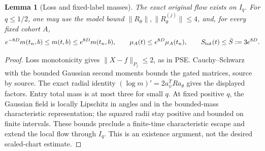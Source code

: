 \documentclass[11pt]{article}
\numberwithin{equation}{section}
\newtheorem{lemma}[theorem]{Lemma}
\begin{document}
\begin{lemma}[Loss and fixed-label masses]
\label{an07fwcv1:massrough}
The exact original flow exists on \(I_q\). For \(q\le1/2\),
one may use the model bound \(\|R_\theta\|,\|R^{(j)}_\theta\|\le4\),
and, for every fixed cohort \(A\),
\begin{equation}
 e^{-8D}m(t_n,b)\le m(t,b)\le e^{8D}m(t_n,b),\qquad
 \mu_A(t)\le e^{8D}\mu_A(t_n),\qquad
 S_{\rm tot}(t)\le\bar S:=3e^{8D}.
 \label{an07fwcv1:roughmass}
\end{equation}
\end{lemma}
\begin{proof}
Loss monotonicity gives \(\|X-f\|_{P_j}\le2\), as in PSE.
Cauchy--Schwarz with the bounded Gaussian second moments bounds
the gated matrices, source by source. The exact radial identity
\((\log m)'=2a_\psi^TRa_\theta\) gives the displayed factors.
Entry total mass is at most three for small \(q\).
At fixed positive \(q\), the Gaussian field is locally Lipschitz
in angles and in the bounded-mass characteristic representation;
the squared radii stay positive and bounded on finite intervals.
These bounds preclude a finite-time characteristic escape and
extend the local flow through \(I_q\). This is an existence
argument, not the desired scaled-chart estimate.
\end{proof}
\end{document}
